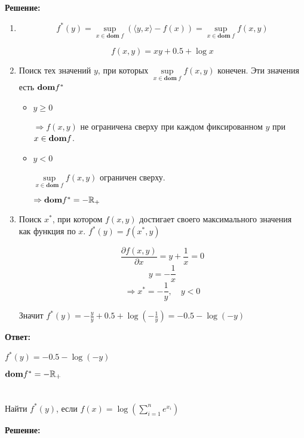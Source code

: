 \documentclass[a4paper,12pt]{article}
\newcommand{\lt}{\left}
\newcommand{\rt}{\right}
\newcommand{\p}{\partial}
\newcommand{\fr}{\frac}
\newcommand{\bb}{\mathbb}
\begin{document}
\vspace{\baselineskip}

\textbf{Решение:}

\begin{enumerate}
	\item $$f^*(y) = \sup\limits_{x \in \mathbf{dom} \; f} \left( \langle y,x\rangle - f(x)\right)  = \sup\limits_{x \in \mathbf{dom} \; f} f(x,y)$$
	
	$$f(x, y) = xy + 0.5 + \log x$$
	
	\item  Поиск тех значений $y$, при которых $ \sup\limits_{x \in \mathbf{dom} \; f} f(x,y)$ конечен. Эти значения есть ${\bf dom}f^*$
	
	\begin{itemize}
		\item $y \ge 0$
		
		$\Rightarrow f(x,y)$ не ограничена сверху при каждом фиксированном $y$ при $ x \in {\bf dom} f$.
		
		\item $y < 0$
		
		$\sup\limits_{x \in \mathbf{dom} \; f}f(x,y)$ ограничен сверху.
		
		$\Rightarrow {\bf dom}f^* = -\bb R_+$
	\end{itemize}
	\item Поиск $x^*$, при котором $f(x,y)$ достигает своего максимального значения как функция по $x$. $f^*(y) = f(x^*, y)$
	
	$$\fr{\p f(x, y)}{\p x} = y + \fr{1}{x} = 0$$
	$$y = -\fr{1}{x}$$
	$$\Rightarrow x^* = -\fr{1}{y}, \quad y < 0$$
	
	Значит $f^*(y) = -\fr{y}{y} +  0.5 + \log \lt(-\fr{1}{y}\rt) = -0.5 - \log(-y)$
	
\end{enumerate}
\textbf{Ответ:}

$f^*(y) =-0.5 - \log(-y)$

${\bf dom}f^* = -\bb R_+$



\section{}
Найти $f^*(y)$, если $f(x) = \log \left( \sum\limits_{i=1}^n e^{x_i} \right)$

\vspace{\baselineskip}

\textbf{Решение:}
\end{document}
